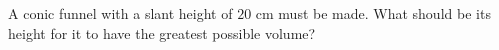 
%
%
%
%
% 
% 

\question[3] A conic funnel with a slant height of $20$ cm must be made. What should 
be its height for it to have the greatest possible volume?


\ifprintanswers
\fi 

